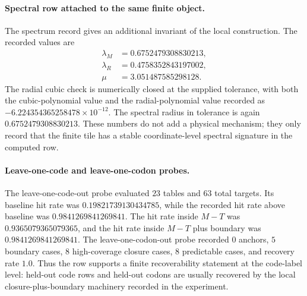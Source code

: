 \paragraph{Spectral row attached to the same finite object.}
The spectrum record gives an additional invariant of the local construction.  The recorded values are
$$
\begin{aligned}
\lambda_M&=0.6752479308830213,\\
\lambda_R&=0.4758352843197002,\\
\mu&=3.051487585298128.
\end{aligned}
$$
The radial cubic check is numerically closed at the supplied tolerance, with both the cubic-polynomial value and the radial-polynomial value recorded as $-6.224354365258478\times 10^{-12}$.  The spectral radius in tolerance is again $0.6752479308830213$.  These numbers do not add a physical mechanism; they only record that the finite tile has a stable coordinate-level spectral signature in the computed row.

\paragraph{Leave-one-code and leave-one-codon probes.}
The leave-one-code-out probe evaluated $23$ tables and $63$ total targets.  Its baseline hit rate was $0.19821739130434785$, while the recorded hit rate above baseline was $0.9841269841269841$.  The hit rate inside $M-T$ was $0.9365079365079365$, and the hit rate inside $M-T$ plus boundary was $0.9841269841269841$.  The leave-one-codon-out probe recorded $0$ anchors, $5$ boundary cases, $8$ high-coverage closure cases, $8$ predictable cases, and recovery rate $1.0$.  Thus the row supports a finite recoverability statement at the code-label level: held-out code rows and held-out codons are usually recovered by the local closure-plus-boundary machinery recorded in the experiment.

